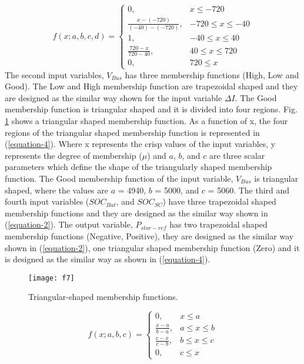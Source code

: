 \begin{equation}\label{equation-3}
f(x;a,b,c,d)=
    \begin{cases}
      0, &  x\leq -720\\
      \frac{x-(-720)}{(-40)-(-720)}, & -720\leq x \leq -40 \\
       1, & -40\leq x \leq 40 \\
       \frac{720-x}{720-40}, & 40\leq x \leq 720 \\
       0, &  720\leq x
    \end{cases}
\end{equation}
The second input variables, $V_{Bus}$ has three membership functions (High, Low and Good). The Low and High membership function are trapezoidal shaped and they are designed as the similar way shown for the input variable $\Delta I$. The Good membership function is triangular shaped and it is divided into four regions. Fig. \ref{sec4_f7} shows a triangular shaped membership function. As a function of x, the four regions of the triangular shaped membership function is represented in (\ref{equation-4}). Where x represents the crisp values of the input variables, y represents the degree of membership ($\mu$) and $a$, $b$, and $c$ are three scalar parameters which define the shape of the triangularly shaped membership function. The Good membership function of the input variable, $V_{Bus}$ is triangular shaped, where the values are $a$ = 4940, $b$ = 5000, and $c$ = 5060. The third and fourth input variables ($SOC_{Bat}$, and $SOC_{SC}$) have three trapezoidal shaped membership functions and they are designed as the similar way shown in (\ref{equation-2}). The output variable, $P_{stor-ref}$ has two trapezoidal shaped membership functions (Negative, Positive), they are designed as the similar way shown in (\ref{equation-2}), one triangular shaped membership function (Zero) and it is designed as the similar way as shown in (\ref{equation-4}). 
\begin{figure}[ht!]
\centering
\texttt{[image: f7]}
\caption{Triangular-shaped membership functions.}
\label{sec4_f7}
\end{figure}
\begin{equation}\label{equation-4}
f(x;a,b,c)=
    \begin{cases}
      0, &  x\leq a\\
      \frac{x-a}{b-a}, & a\leq x \leq b \\
       \frac{c-x}{c-b}, & b\leq x \leq c \\
       0, &  c\leq x
    \end{cases}
\end{equation}
